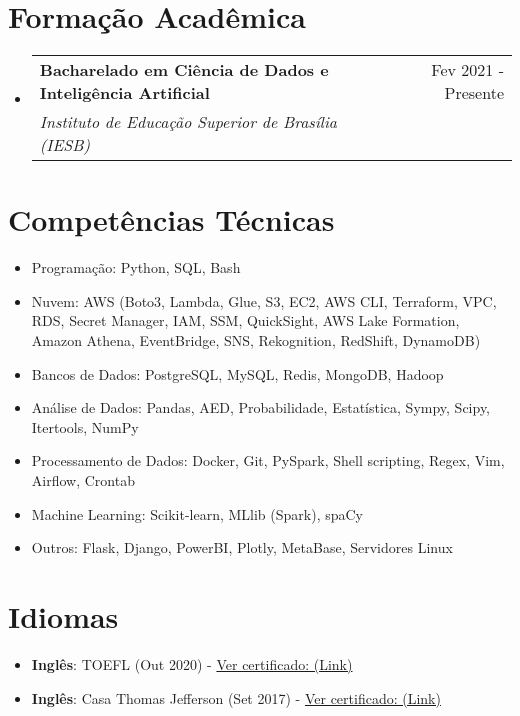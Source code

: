 \documentclass[letterpaper,11pt]{article}%
\makeatletter
\newcommand{\resumeSubheading}[4]{\vspace{-1pt}\item\begin{tabular*}{0.97\textwidth}[t]{l@{\extracolsep{\fill}}r}\textbf{#1} & #2 \\\textit{\small #3} & \textit{\small #4} \\\end{tabular*}\vspace{-8pt}}%
\newcommand{\resumeSubHeadingListStart}{\begin{itemize}[leftmargin=0.15in, label={}, itemsep=0pt, parsep=0pt]}%
\newcommand{\resumeSubHeadingListEnd}{\end{itemize}}%
\newcommand{\resumeItemListStart}{\begin{itemize}[itemsep=0pt, parsep=0pt]}%
\newcommand{\resumeItemListEnd}{\end{itemize}\vspace{-1pt}}%
\makeatother
\begin{document}
%
\section*{Formação Acadêmica}%
\label{sec:FormaoAcadmica}%
\resumeSubHeadingListStart%
\resumeSubheading{Bacharelado em Ciência de Dados e Inteligência Artificial}{Fev 2021 - Presente}{Instituto de Educação Superior de Brasília (IESB)}{}%
\resumeSubHeadingListEnd

%
\section*{Competências Técnicas}%
\label{sec:CompetnciasTcnicas}%
\begin{multicols}{2}%
\resumeItemListStart%
\item Programação: Python, SQL, Bash%
\item Nuvem: AWS (Boto3, Lambda, Glue, S3, EC2, AWS CLI, Terraform, VPC, RDS, Secret Manager, IAM, SSM, QuickSight, AWS Lake Formation, Amazon Athena, EventBridge, SNS, Rekognition, RedShift, DynamoDB)%
\item Bancos de Dados: PostgreSQL, MySQL, Redis, MongoDB, Hadoop%
\item Análise de Dados: Pandas, AED, Probabilidade, Estatística, Sympy, Scipy, Itertools, NumPy%
\item Processamento de Dados: Docker, Git, PySpark, Shell scripting, Regex, Vim, Airflow, Crontab%
\item Machine Learning: Scikit-learn, MLlib (Spark), spaCy%
\item Outros: Flask, Django, PowerBI, Plotly, MetaBase, Servidores Linux%
\resumeItemListEnd%
\end{multicols}

%
\section*{Idiomas}%
\label{sec:Idiomas}%
\begin{itemize}[leftmargin=0.15in, label={}]%
\item%
\textbf{Inglês}: TOEFL (Out 2020) - \href{https://github.com/s33ding/my_resume/blob/main/my_certificates/english_TOEFL_my_score.pdf}{Ver certificado: (Link)}%
\item%
\textbf{Inglês}: Casa Thomas Jefferson (Set 2017) - \href{https://github.com/s33ding/my_resume/blob/main/my_certificates/english_Casa%20Thomas%20Jefferson.pdf}{Ver certificado: (Link)}%
\end{itemize}

%
\end{document}
